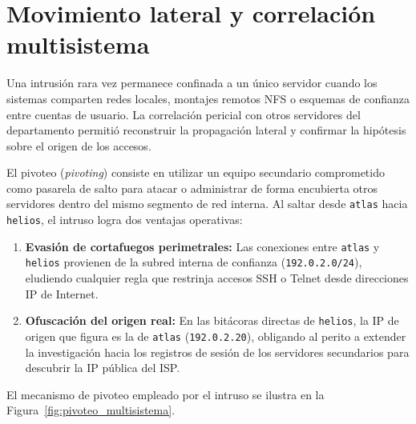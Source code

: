 \chapter{Movimiento lateral y correlación multisistema}
\label{cap:correlacion_multisistema}

Una intrusión rara vez permanece confinada a un único servidor cuando los sistemas comparten redes locales, montajes remotos NFS o esquemas de confianza entre cuentas de usuario. La correlación pericial con otros servidores del departamento permitió reconstruir la propagación lateral y confirmar la hipótesis sobre el origen de los accesos.

\begin{notaforense}
El pivoteo (\textit{pivoting}) consiste en utilizar un equipo secundario comprometido como pasarela de salto para atacar o administrar de forma encubierta otros servidores dentro del mismo segmento de red interna. Al saltar desde \texttt{atlas} hacia \texttt{helios}, el intruso logra dos ventajas operativas:
\begin{enumerate}
    \item \textbf{Evasión de cortafuegos perimetrales:} Las conexiones entre \texttt{atlas} y \texttt{helios} provienen de la subred interna de confianza (\texttt{192.0.2.0/24}), eludiendo cualquier regla que restrinja accesos SSH o Telnet desde direcciones IP de Internet.
    \item \textbf{Ofuscación del origen real:} En las bitácoras directas de \texttt{helios}, la IP de origen que figura es la de \texttt{atlas} (\texttt{192.0.2.20}), obligando al perito a extender la investigación hacia los registros de sesión de los servidores secundarios para descubrir la IP pública del ISP.
\end{enumerate}
\end{notaforense}

El mecanismo de pivoteo empleado por el intruso se ilustra en la Figura~\ref{fig:pivoteo_multisistema}.


